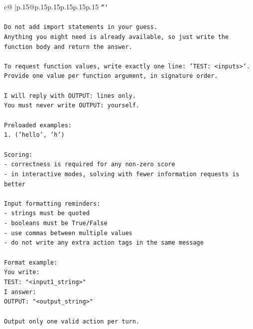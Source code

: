 \documentclass{article}
\begin{document}
{\begin{supertabular}{c@{$\;$}|p{.15\linewidth}@{}p{.15\linewidth}p{.15\linewidth}p{.15\linewidth}p{.15\linewidth}p{.15\linewidth}}
{{{\texttt{```} \\
\\ 
\texttt{Do not add import statements in your guess.} \\
\texttt{Anything you might need is already available, so just write the function body and return the answer.} \\
\\ 
\texttt{To request function values, write exactly one line: `TEST: <inputs>`.} \\
\texttt{Provide one value per function argument, in signature order.} \\
\\ 
\texttt{I will reply with OUTPUT: lines only.} \\
\texttt{You must never write OUTPUT: yourself.} \\
\\ 
\texttt{Preloaded examples:} \\
\texttt{1. ('hello', 'h')} \\
\\ 
\texttt{Scoring:} \\
\texttt{{-} correctness is required for any non{-}zero score} \\
\texttt{{-} in interactive modes, solving with fewer information requests is better} \\
\\ 
\texttt{Input formatting reminders:} \\
\texttt{{-} strings must be quoted} \\
\texttt{{-} booleans must be True/False} \\
\texttt{{-} use commas between multiple values} \\
\texttt{{-} do not write any extra action tags in the same message} \\
\\ 
\texttt{Format example:} \\
\texttt{You write:} \\
\texttt{TEST: "<input1\_string>"} \\
\texttt{I answer:} \\
\texttt{OUTPUT: "<output\_string>"} \\
\\ 
\texttt{Output only one valid action per turn.} \\
            }
        }
    }
     \\ \\


\end{supertabular}}
\end{document}
